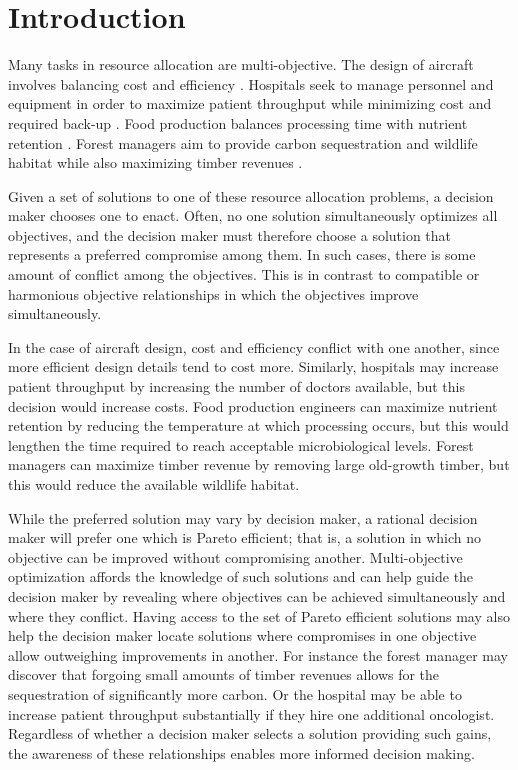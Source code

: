 
\section{Introduction}
\label{sec:intro}

Many tasks in resource allocation are multi-objective. The design of aircraft involves balancing cost and efficiency \cite{wang2014multi}. Hospitals seek to manage personnel and equipment in order to maximize patient throughput while minimizing cost and required back-up \cite{hutzschenreuter2009evolutionary}. Food production balances processing time with nutrient retention \cite{sendin2010efficient}. Forest managers aim to provide carbon sequestration and wildlife habitat while also maximizing timber revenues \cite{toth2013ecosel}.

Given a set of solutions to one of these resource allocation problems, a decision maker chooses one to enact. Often, no one solution simultaneously optimizes all objectives, and the decision maker must therefore choose a solution that represents a preferred compromise among them. In such cases, there is some amount of conflict among the objectives. This is in contrast to compatible or harmonious objective relationships in which the objectives improve simultaneously.

In the case of aircraft design, cost and efficiency conflict with one another, since more efficient design details tend to cost more. Similarly, hospitals may increase patient throughput by increasing the number of doctors available, but this decision would increase costs. Food production engineers can maximize nutrient retention by reducing the temperature at which processing occurs, but this would lengthen the time required to reach acceptable microbiological levels. Forest managers can maximize timber revenue by removing large old-growth timber, but this would reduce the available wildlife habitat.

While the preferred solution may vary by decision maker, a rational decision maker will prefer one which is Pareto efficient; that is, a solution in which no objective can be improved without compromising another. Multi-objective optimization affords the knowledge of such solutions and can help guide the decision maker by revealing where objectives can be achieved simultaneously and where they conflict. Having access to the set of Pareto efficient solutions may also help the decision maker locate solutions where compromises in one objective allow outweighing improvements in another. For instance the forest manager may discover that forgoing small amounts of timber revenues allows for the sequestration of significantly more carbon. Or the hospital may be able to increase patient throughput substantially if they hire one additional oncologist.
Regardless of whether a decision maker selects a solution providing such gains, the awareness of these relationships enables more informed decision making.

